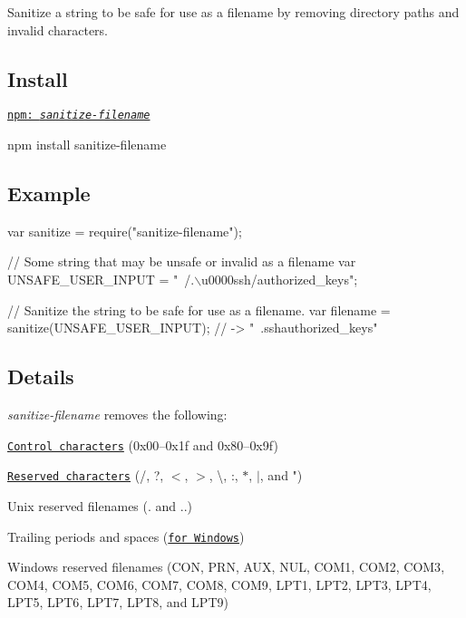 Sanitize a string to be safe for use as a filename by removing directory paths and invalid characters.

\subsection*{Install}

\href{https://www.npmjs.com/package/sanitize-filename}{\tt npm\+: {\itshape sanitize-\/filename}}


\begin{DoxyCode}
npm install sanitize-filename
\end{DoxyCode}


\subsection*{Example}


\begin{DoxyCode}
var sanitize = require("sanitize-filename");

// Some string that may be unsafe or invalid as a filename
var UNSAFE\_USER\_INPUT = "~/.\(\backslash\)u0000ssh/authorized\_keys";

// Sanitize the string to be safe for use as a filename.
var filename = sanitize(UNSAFE\_USER\_INPUT);
// -> "~.sshauthorized\_keys"
\end{DoxyCode}


\subsection*{Details}

{\itshape sanitize-\/filename} removes the following\+:


\begin{DoxyItemize}
\item \href{https://en.wikipedia.org/wiki/C0_and_C1_control_codes}{\tt Control characters} ({\ttfamily 0x00}–{\ttfamily 0x1f} and {\ttfamily 0x80}–{\ttfamily 0x9f})
\item \href{https://kb.acronis.com/content/39790}{\tt Reserved characters} ({\ttfamily /}, {\ttfamily ?}, {\ttfamily $<$}, {\ttfamily $>$}, {\ttfamily \textbackslash{}}, {\ttfamily \+:}, {\ttfamily $\ast$}, {\ttfamily $\vert$}, and {\ttfamily "})
\item Unix reserved filenames ({\ttfamily .} and {\ttfamily ..})
\item Trailing periods and spaces (\href{https://msdn.microsoft.com/en-us/library/aa365247(v=vs.85).aspx#Naming_Conventions}{\tt for Windows})
\item Windows reserved filenames ({\ttfamily C\+ON}, {\ttfamily P\+RN}, {\ttfamily A\+UX}, {\ttfamily N\+UL}, {\ttfamily C\+O\+M1}, {\ttfamily C\+O\+M2}, {\ttfamily C\+O\+M3}, {\ttfamily C\+O\+M4}, {\ttfamily C\+O\+M5}, {\ttfamily C\+O\+M6}, {\ttfamily C\+O\+M7}, {\ttfamily C\+O\+M8}, {\ttfamily C\+O\+M9}, {\ttfamily L\+P\+T1}, {\ttfamily L\+P\+T2}, {\ttfamily L\+P\+T3}, {\ttfamily L\+P\+T4}, {\ttfamily L\+P\+T5}, {\ttfamily L\+P\+T6}, {\ttfamily L\+P\+T7}, {\ttfamily L\+P\+T8}, and {\ttfamily L\+P\+T9})
\end{DoxyItemize}

